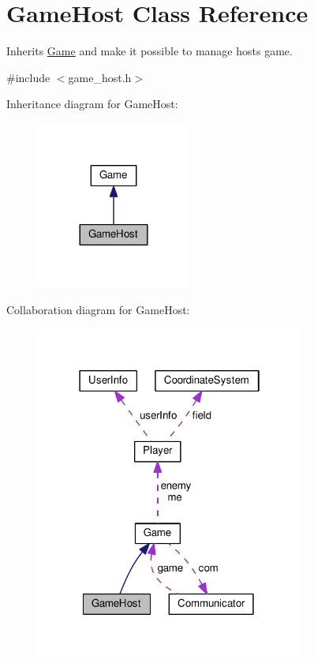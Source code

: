 \hypertarget{classMODEL_1_1GameHost}{}\section{Game\+Host Class Reference}
\label{classMODEL_1_1GameHost}


Inherits \hyperlink{classMODEL_1_1Game}{Game} and make it possible to manage hosts game.  




{\ttfamily \#include $<$game\+\_\+host.\+h$>$}



Inheritance diagram for Game\+Host\+:\nopagebreak
\begin{figure}[H]
\begin{center}
\leavevmode
\includegraphics[width=144pt]{classMODEL_1_1GameHost__inherit__graph}
\end{center}
\end{figure}


Collaboration diagram for Game\+Host\+:\nopagebreak
\begin{figure}[H]
\begin{center}
\leavevmode
\includegraphics[width=250pt]{classMODEL_1_1GameHost__coll__graph}
\end{center}
\end{figure}
